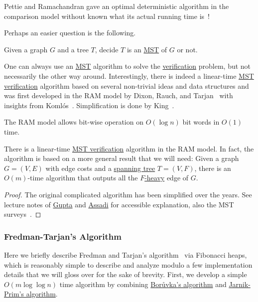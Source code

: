 \begin{note}
	Pettie and Ramachandran gave an optimal deterministic algorithm in the comparison model without known what its actual running time is~\cite{pettie2002optimal}!
\end{note}

Perhaps an easier question is the following.

\begin{problem}\label{prb:MST-verification}
Given a graph \(G\) and a tree \(T\), decide \(T\) is an \hyperref[prb:MST]{MST} of \(G\) or not.
\end{problem}

One can always use an \hyperref[prb:MST]{MST} algorithm to solve the \hyperref[prb:MST-verification]{verification} problem, but not necessarily the other way around. Interestingly, there is indeed a linear-time \hyperref[prb:MST-verification]{MST verification} algorithm based on several non-trivial ideas and data structures and was first developed in the RAM model by Dixon, Rauch, and Tarjan~\cite{dixon1992verification} with insights from Komlós~\cite{komlos1985linear}. Simplification is done by King~\cite{king1997simpler}.

\begin{note}
	The RAM model allows bit-wise operation on \(O(\log n)\) bit words in \(O(1)\) time.
\end{note}

\begin{theorem}\label{thm:MST-verification}
	There is a linear-time \hyperref[prb:MST-verification]{MST verification} algorithm in the RAM model. In fact, the algorithm is based on a more general result that we will need: Given a graph \(G = (V, E)\) with edge costs and a \hyperref[def:spanning-tree]{spanning tree} \(T = (V, F)\), there is an \(O(m)\)-time algorithm that outputs all the \hyperref[def:heavy]{\(F\)-heavy} edge of \(G\).
\end{theorem}
\begin{proof}
	The original complicated algorithm has been simplified over the years. See lecture notes of \href{https://www.cs.cmu.edu/~15850/notes/lec1.pdf}{Gupta} and \href{https://sepehr.assadi.info/courses/cs860-w24/Lectures/lec1.pdf}{Assadi} for accessible explanation, also the MST surveys~\cite{eisner1997state,marevs2008saga}.
\end{proof}

\subsubsection{Fredman-Tarjan's Algorithm}
Here we briefly describe Fredman and Tarjan's algorithm~\cite{fredman1987fibonacci,marevs2008saga} via Fibonacci heaps, which is reasonably simple to describe and analyze modulo a few implementation details that we will gloss over for the sake of brevity. First, we develop a simple \(O(m \log \log n)\) time algorithm by combining \hyperref[algo:Boruvka]{Borůvka's algorithm} and \hyperref[algo:Jarnik-Prim]{Jarnik-Prim's algorithm}.

